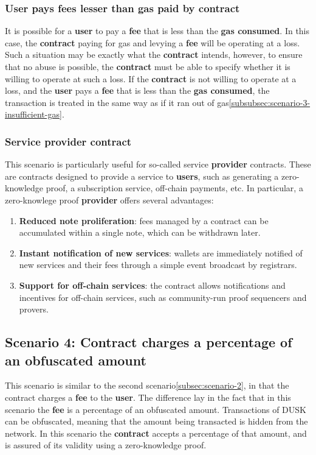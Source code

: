 \documentclass[twocolumn, nofootinbib]{revtex4-2} %
\newcommand{\dusk}{{\footnotesize\textsf{DUSK}}\xspace}
\newcommand{\emphasize}[1]{\textbf{#1}\xspace}
\newcommand{\contract}{\emphasize{contract}}
\newcommand{\fee}{\emphasize{fee}}
\newcommand{\gasconsumed}{\emphasize{gas consumed}}
\newcommand{\provider}{\emphasize{provider}}
\newcommand{\user}{\emphasize{user}}
\newcommand{\users}{\emphasize{users}}
\begin{document}
    \subsubsection*{User pays fees lesser than gas paid by contract}\label{subsubsec:scenario-3-user-pays-fees-lesser}
    It is possible for a \user to pay a \fee that is less than the \gasconsumed.
    In this case, the \contract paying for gas and levying a \fee will be
    operating at a loss.
    Such a situation may be exactly what the \contract intends, however, to
    ensure that no abuse is possible, the \contract must be able to specify
    whether it is willing to operate at such a loss.
    If the \contract is not willing to operate at a loss, and the \user pays
    a \fee that is less than the \gasconsumed, the transaction is treated in
    the same way as if it ran out of gas\ref{subsubsec:scenario-3-insufficient-gas}.

    \subsubsection*{Service provider contract}\label{subsubsec:scenario-3-service-provider-contract}
    This scenario is particularly useful for so-called service \provider contracts.
    These are contracts designed to provide a service to \users, such as
    generating a zero-knowledge proof, a subscription service, off-chain
    payments, etc.
    In particular, a zero-knowlege proof \provider offers several advantages:

    \begin{enumerate}
        \item \textbf{Reduced note proliferation}: fees managed by a contract
        can be accumulated within a single note, which can be withdrawn
        later.
        \item \textbf{Instant notification of new services}: wallets are
        immediately notified of new services and their fees through a
        simple event broadcast by registrars.
        \item \textbf{Support for off-chain services}: the contract allows
        notifications and incentives for off-chain services, such as
        community-run proof sequencers and provers.
    \end{enumerate}

    \subsection*{Scenario 4: Contract charges a percentage of an obfuscated amount}\label{subsec:scenario-4}
    This scenario is similar to the second scenario\ref{subsec:scenario-2}, in
    that the contract charges a \fee to the \user.
    The difference lay in the fact that in this scenario the \fee is a
    percentage of an obfuscated amount.
    Transactions of \dusk can be obfuscated, meaning that the amount being
    transacted is hidden from the network.
    In this scenario the \contract accepts a percentage of that amount, and
    is assured of its validity using a zero-knowledge proof.
\end{document}
